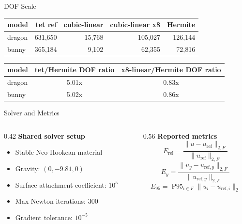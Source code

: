 \documentclass[aspectratio=169,10pt]{beamer}
\begin{document}
\begin{frame}{DOF Scale}
  \small
  \begin{table}
    \centering
    \begin{tabular}{lrrrr}
      \toprule
      model & tet ref & cubic-linear & cubic-linear x8 & Hermite \\
      \midrule
      dragon & 631,650 & 15,768 & 105,027 & 126,144 \\
      bunny & 365,184 & 9,102 & 62,355 & 72,816 \\
      \bottomrule
    \end{tabular}
  \end{table}

  \vspace{0.6em}
  \begin{table}
    \centering
    \begin{tabular}{lcc}
      \toprule
      model & tet/Hermite DOF ratio & x8-linear/Hermite DOF ratio \\
      \midrule
      dragon & 5.01x & 0.83x \\
      bunny & 5.02x & 0.86x \\
      \bottomrule
    \end{tabular}
  \end{table}
\end{frame}

\begin{frame}{Solver and Metrics}
  \small
  \begin{columns}[T]
    \begin{column}{0.42\linewidth}
      \textbf{Shared solver setup}
      \begin{itemize}
        \item Stable Neo-Hookean material
        \item Gravity: $(0, -9.81, 0)$
        \item Surface attachment coefficient: $10^5$
        \item Max Newton iterations: 300
        \item Gradient tolerance: $10^{-5}$
      \end{itemize}
    \end{column}
    \begin{column}{0.56\linewidth}
      \textbf{Reported metrics}
      \[
        E_{\mathrm{rel}} =
        \frac{\|u - u_{\mathrm{ref}}\|_{2,F}}
             {\|u_{\mathrm{ref}}\|_{2,F}}
      \]
      \[
        E_y =
        \frac{\|u_y - u_{\mathrm{ref},y}\|_{2,F}}
             {\|u_{\mathrm{ref},y}\|_{2,F}}
      \]
      \[
        E_{95} = \operatorname{P95}_{i \in F}
        \|u_i - u_{\mathrm{ref},i}\|_2
      \]
    \end{column}
  \end{columns}
\end{frame}
\end{document}
